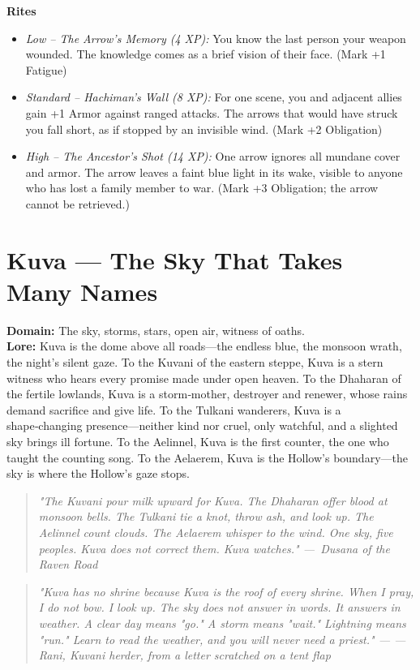 \documentclass[12pt]{book}
\newcommand{\dusana}[1]{%
    \begin{quote}\itshape #1 ---~Dusana of the Raven Road\end{quote}}
\newcommand{\letter}[2]{%
    \begin{quote}\small\itshape #1 \hfill --- #2\end{quote}}
\begin{document}
\begin{infobox}
\textbf{Rites}
\begin{itemize}
    \item \textit{Low -- The Arrow's Memory (4 XP):} You know the last person your weapon wounded. The knowledge comes as a brief vision of their face. (Mark +1 Fatigue)
    \item \textit{Standard -- Hachiman's Wall (8 XP):} For one scene, you and adjacent allies gain +1 Armor against ranged attacks. The arrows that would have struck you fall short, as if stopped by an invisible wind. (Mark +2 Obligation)
    \item \textit{High -- The Ancestor's Shot (14 XP):} One arrow ignores all mundane cover and armor. The arrow leaves a faint blue light in its wake, visible to anyone who has lost a family member to war. (Mark +3 Obligation; the arrow cannot be retrieved.)
\end{itemize}
\end{infobox}

\section{Kuva --- The Sky That Takes Many Names}
\noindent\textbf{Domain:} The sky, storms, stars, open air, witness of oaths.\\
\textbf{Lore:} Kuva is the dome above all roads---the endless blue, the monsoon wrath, the night's silent gaze. To the Kuvani of the eastern steppe, Kuva is a stern witness who hears every promise made under open heaven. To the Dhaharan of the fertile lowlands, Kuva is a storm‑mother, destroyer and renewer, whose rains demand sacrifice and give life. To the Tulkani wanderers, Kuva is a shape‑changing presence---neither kind nor cruel, only watchful, and a slighted sky brings ill fortune. To the Aelinnel, Kuva is the first counter, the one who taught the counting song. To the Aelaerem, Kuva is the Hollow's boundary---the sky is where the Hollow's gaze stops.

\vspace{0.5em}
\dusana{"The Kuvani pour milk upward for Kuva. The Dhaharan offer blood at monsoon bells. The Tulkani tie a knot, throw ash, and look up. The Aelinnel count clouds. The Aelaerem whisper to the wind. One sky, five peoples. Kuva does not correct them. Kuva watches."}

\letter{"Kuva has no shrine because Kuva is the roof of every shrine. When I pray, I do not bow. I look up. The sky does not answer in words. It answers in weather. A clear day means "go." A storm means "wait." Lightning means "run." Learn to read the weather, and you will never need a priest."}{--- Rani, Kuvani herder, from a letter scratched on a tent flap}
\end{document}
